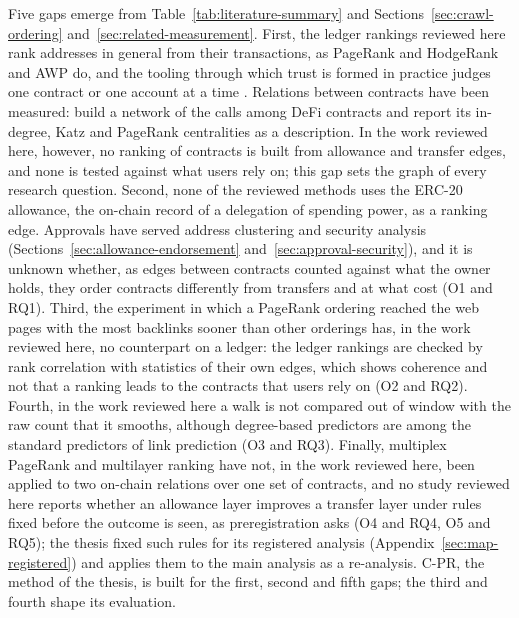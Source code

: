 
Five gaps emerge from Table~\ref{tab:literature-summary} and Sections~\ref{sec:crawl-ordering} and~\ref{sec:related-measurement}. First, the ledger rankings reviewed here rank addresses in general from their transactions, as PageRank and HodgeRank \parencite{do2023hodgerank} and AWP \parencite{do2023awp} do, and the tooling through which trust is formed in practice judges one contract or one account at a time \parencite{humanpassportnddocs}. Relations between contracts have been measured: \textcite{kitzler2023defi} build a network of the calls among DeFi contracts and report its in-degree, Katz and PageRank centralities as a description. In the work reviewed here, however, no ranking of contracts is built from allowance and transfer edges, and none is tested against what users rely on; this gap sets the graph of every research question. Second, none of the reviewed methods uses the ERC-20 allowance, the on-chain record of a delegation of spending power, as a ranking edge. Approvals have served address clustering and security analysis (Sections~\ref{sec:allowance-endorsement} and~\ref{sec:approval-security}), and it is unknown whether, as edges between contracts counted against what the owner holds, they order contracts differently from transfers and at what cost (O1 and RQ1). Third, the experiment in which a PageRank ordering reached the web pages with the most backlinks sooner than other orderings \parencite{cho1998crawling} has, in the work reviewed here, no counterpart on a ledger: the ledger rankings are checked by rank correlation with statistics of their own edges, which shows coherence and not that a ranking leads to the contracts that users rely on (O2 and RQ2). Fourth, in the work reviewed here a walk is not compared out of window with the raw count that it smooths, although degree-based predictors are among the standard predictors of link prediction \parencite{libennowell2007link} (O3 and RQ3). Finally, multiplex PageRank \parencite{halu2013multiplex} and multilayer ranking \parencite{dedomenico2015ranking} have not, in the work reviewed here, been applied to two on-chain relations over one set of contracts, and no study reviewed here reports whether an allowance layer improves a transfer layer under rules fixed before the outcome is seen, as preregistration asks \parencite{nosek2018preregistration} (O4 and RQ4, O5 and RQ5); the thesis fixed such rules for its registered analysis (Appendix~\ref{sec:map-registered}) and applies them to the main analysis as a re-analysis. \mbox{C-PR}, the method of the thesis, is built for the first, second and fifth gaps; the third and fourth shape its evaluation.

